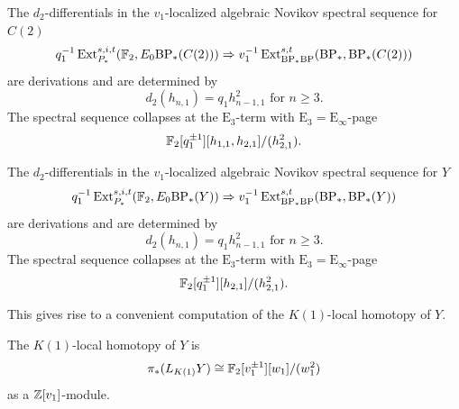 \begin{thm}\label{thm:localized-alg-Nov-Moore}
    The $d_2$-differentials in the $v_1$-localized algebraic Novikov spectral sequence for $C(2)$ \[q_1 ^{-1} \operatorname{\mathrm{Ext}}^{s,i,t} _{P_*} (\operatorname{\mathbb{F}}_2, E_0 \mathrm{BP}_* (C(2))) \Rightarrow v_1^{-1} \operatorname{\mathrm{Ext}}^{s,t} _{\mathrm{BP}_* \mathrm{BP}} (\mathrm{BP}_*, \mathrm{BP}_*(C(2)))\] are derivations and are determined by \[d_2 (h_{n,1}) = q_1 h_{n-1,1}^2 \text{ for } n \geq 3.\] The spectral sequence collapses at the $\mathrm{E}_3$-term with $\mathrm{E}_3 = \mathrm{E}_\infty$-page \[\operatorname{\mathbb{F}}_2 [q_1 ^{\pm 1}][h_{1,1}, h_{2,1}]/(h_{2,1}^2).\]
\end{thm}

\begin{cor}\label{prop:localized-alg-Nov}
    The $d_2$-differentials in the $v_1$-localized algebraic Novikov spectral sequence for $Y$ \[q_1 ^{-1} \operatorname{\mathrm{Ext}}^{s,i,t} _{P_*} (\operatorname{\mathbb{F}}_2, E_0 \mathrm{BP}_* (Y)) \Rightarrow v_1^{-1} \operatorname{\mathrm{Ext}}^{s,t} _{\mathrm{BP}_* \mathrm{BP}} (\mathrm{BP}_*, \mathrm{BP}_*(Y))\] are derivations and are determined by \[d_2 (h_{n,1}) = q_1 h_{n-1,1}^2 \text{ for } n \geq 3.\] The spectral sequence collapses at the $\mathrm{E}_3$-term with $\mathrm{E}_3 = \mathrm{E}_\infty$-page \[\operatorname{\mathbb{F}}_2 [q_1 ^{\pm 1}][h_{2,1}]/(h_{2,1}^2).\]
\end{cor}

This gives rise to a convenient computation of the $K(1)$-local homotopy of $Y$.

\begin{cor}\label{cor:K1-homotopy-Y}
    The $K(1)$-local homotopy of $Y$ is \[ \pi_* (L_{K(1)} Y) \cong \operatorname{\mathbb{F}}_2 [v_1 ^{\pm 1}][w_1] / (w_1 ^2) \] as a $\mathbb{Z}[v_1]$-module.
\end{cor}

